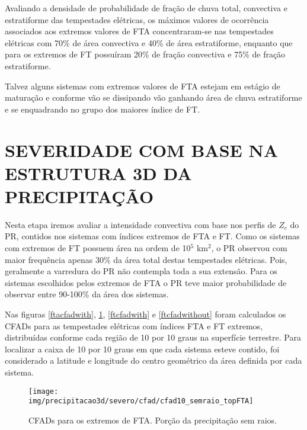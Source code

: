 Avaliando a densidade de probabilidade de fração de chuva total, convectiva e estratiforme das tempestades elétricas, os máximos valores de ocorrência associados aos extremos valores de FTA concentraram-se nas tempestades elétricas com 70\% de área convectiva e 40\% de área estratiforme, enquanto que para os extremos de FT possuíram 20\% de fração convectiva e 75\% de fração estratiforme.

Talvez alguns sistemas com extremos valores de FTA estejam em estágio de maturação e conforme vão se dissipando vão ganhando área de chuva estratiforme e se enquadrando no grupo dos maiores índice de FT. 



\section{SEVERIDADE COM BASE NA ESTRUTURA 3D DA PRECIPITAÇÃO}

Nesta etapa iremos avaliar a intensidade convectiva com base nos perfis de $Z_c$ do PR, contidos nos sistemas com índices extremos de FTA e FT. Como os sistemas com extremos de FT possuem área na ordem de 10$^5$ km$^2$, o PR observou com maior frequência apenas  30\% da área total destas tempestades elétricas. Pois, geralmente a varredura do PR não contempla toda a sua extensão. Para os sistemas escolhidos pelos extremos de FTA o PR teve maior probabilidade de observar entre 90-100\% da área dos sistemas.

Nas figuras \ref{ftacfadwith}, \ref{ftacfadwithout}, \ref{ftcfadwith} e \ref{ftcfadwithout} foram calculados os CFADs para as tempestades elétricas com índices FTA e FT extremos, distribuídas conforme cada região de 10 por 10 graus na superfície terrestre. Para localizar a caixa de 10 por 10 graus em que cada sistema esteve contido, foi considerado a latitude e longitude do centro geométrico da área definida por cada sistema.


\begin{figure}[!ht]
  \centering
  \texttt{[image: img/precipitacao3d/severo/cfad/cfad10\_semraio\_topFTA]}
 \caption{CFADs para os extremos de FTA. Porção da precipitação sem raios.}
 \label{ftacfadwithout}
\end{figure} 

